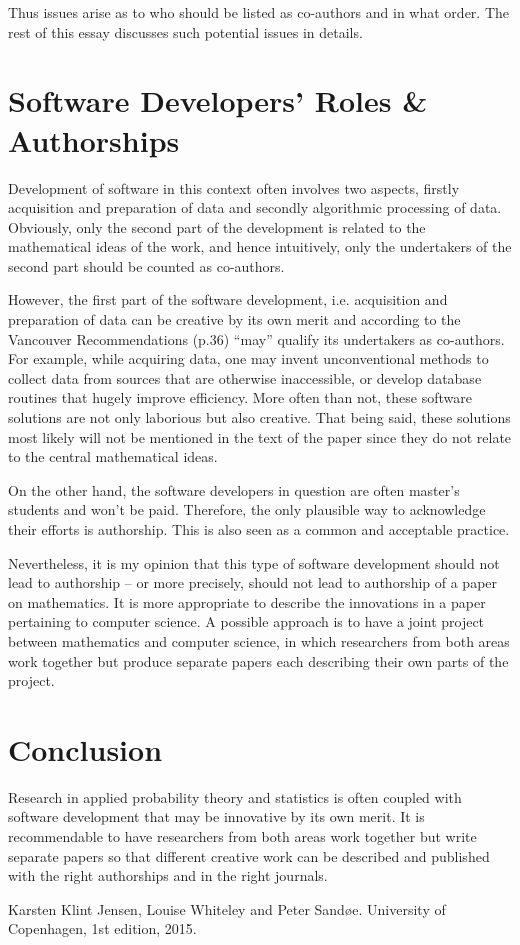 \documentclass{article}
\begin{document}
Thus issues arise as to who should be listed as co-authors and in what
order. The rest of this essay discusses such potential issues in
details.

\section{Software Developers' Roles \& Authorships}
Development of software in this context often involves two aspects,
firstly acquisition and preparation of data and secondly algorithmic
processing of data. Obviously, only the second part of the development
is related to the mathematical ideas of the work, and hence
intuitively, only the undertakers of the second part should be counted
as co-authors.

However, the first part of the software development, i.e. acquisition
and preparation of data can be creative by its own merit and according
to the Vancouver Recommendations \cite{RCR} (p.36) ``may'' qualify its
undertakers as co-authors. For example, while acquiring data, one may
invent unconventional methods to collect data from sources that are
otherwise inaccessible, or develop database routines that hugely
improve efficiency. More often than not, these software solutions are
not only laborious but also creative. That being said, these solutions
most likely will not be mentioned in the text of the paper since they
do not relate to the central mathematical ideas.


On the other hand, the software developers in question are often
master's students and won't be paid. Therefore, the only plausible way
to acknowledge their efforts is authorship. This is also seen as a
common and acceptable practice.

Nevertheless, it is my opinion that this type of software development
should not lead to authorship -- or more precisely, should not
lead to authorship of a paper on mathematics. It is more appropriate
to describe the innovations in a paper pertaining to computer
science. A possible approach is to have a joint project between
mathematics and computer science, in which researchers from both areas
work together but produce separate papers each describing their own
parts of the project.

\section{Conclusion}
Research in applied probability theory and statistics is often coupled
with software development that may be innovative by its own merit. It
is recommendable to have researchers from both areas work together but
write separate papers so that different creative work can be described
and published with the right authorships and in the right journals.



\begin{thebibliography}{9}

  Karsten Klint Jensen, Louise Whiteley and Peter Sand\o e.
  University of Copenhagen,
  1st edition,
  2015.

\end{thebibliography}
\end{document}
